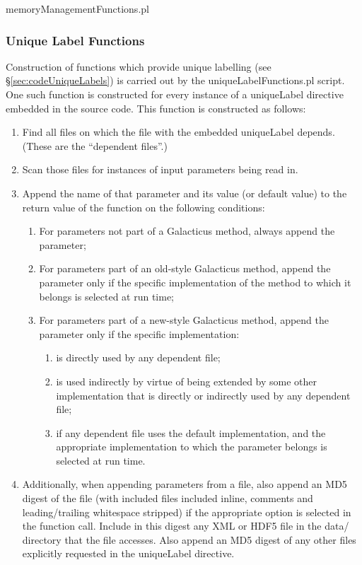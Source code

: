 {\normalfont \ttfamily memoryManagementFunctions.pl}
 
\subsubsection{Unique Label Functions}

Construction of functions which provide unique labelling (see \S\ref{sec:codeUniqueLabels}) is carried out by the {\normalfont \ttfamily uniqueLabelFunctions.pl} script. One such function is constructed for every instance of a {\normalfont \ttfamily uniqueLabel} directive embedded in the source code. This function is constructed as follows:
\begin{enumerate}
\item Find all files on which the file with the embedded {\normalfont \ttfamily uniqueLabel} depends. (These are the ``dependent files''.)
\item Scan those files for instances of input parameters being read in.
\item Append the name of that parameter and its value (or default value) to the return value of the function on the following conditions:
\begin{enumerate}
 \item For parameters not part of a Galacticus method, always append the parameter;
 \item For parameters part of an old-style Galacticus method, append the parameter only if the specific implementation of the method to which it belongs is selected at run time;
 \item For parameters part of a new-style Galacticus method, append the parameter only if the specific implementation:
\begin{enumerate}
  \item is directly used by any dependent file;
  \item is used indirectly by virtue of being extended by some other implementation that is directly or indirectly used by any dependent file;
  \item if any dependent file uses the default implementation, and the appropriate implementation to which the parameter belongs is selected at run time.
\end{enumerate}
\end{enumerate}
\item Additionally, when appending parameters from a file, also append an MD5 digest of the file (with included files included inline, comments and leading/trailing whitespace stripped) if the appropriate option is selected in the function  call. Include in this digest any XML or HDF5 file in the data/ directory that the file accesses. Also append an MD5 digest of any other files explicitly requested in the {\normalfont \ttfamily uniqueLabel} directive.
\end{enumerate}


